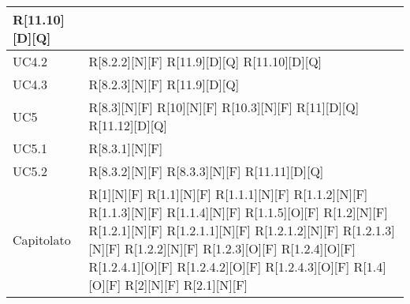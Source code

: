 \begin{longtable}{X | X}
		R[11.10][D][Q] \\
		\hline
		UC4.2 & 
		R[8.2.2][N][F] \newline
		R[11.9][D][Q] \newline
		R[11.10][D][Q] \\
		\hline
		UC4.3 &
		R[8.2.3][N][F] \newline
		R[11.9][D][Q] \\
		\hline
		UC5 & 
		R[8.3][N][F] \newline
		R[10][N][F] \newline
		R[10.3][N][F] \newline
		R[11][D][Q] \newline
		 R[11.12][D][Q] \\
		\hline
		UC5.1 & 
		R[8.3.1][N][F] \\
		\hline
		UC5.2 & 
		R[8.3.2][N][F] \newline
		R[8.3.3][N][F] \newline
		R[11.11][D][Q] \\
		\hline
		Capitolato & 
		R[1][N][F]			 \newline    
		R[1.1][N][F]           \newline
		R[1.1.1][N][F]         \newline
		R[1.1.2][N][F]         \newline
		R[1.1.3][N][F]         \newline
		R[1.1.4][N][F]         \newline
		R[1.1.5][O][F]         \newline
		R[1.2][N][F]           \newline
		R[1.2.1][N][F]         \newline
		R[1.2.1.1][N][F]       \newline
		R[1.2.1.2][N][F]       \newline
		R[1.2.1.3][N][F]       \newline
		R[1.2.2][N][F]         \newline
		R[1.2.3][O][F]         \newline
		R[1.2.4][O][F]         \newline
		R[1.2.4.1][O][F]       \newline
		R[1.2.4.2][O][F]       \newline
		R[1.2.4.3][O][F]       \newline
		R[1.4][O][F]           \newline
		R[2][N][F]             \newline
		R[2.1][N][F]	         \newline

\end{longtable}
